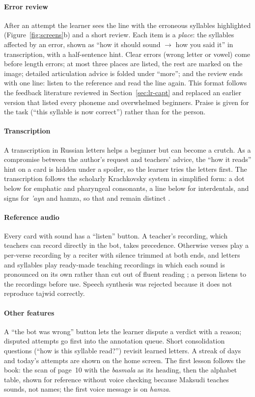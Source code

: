 \paragraph{Error review} After an attempt the learner sees the line with the erroneous syllables
highlighted (Figure~\ref{fig:screens}b) and a short review. Each item is a \emph{place}: the syllables
affected by an error, shown as ``how it should sound $\to$ how you said it'' in transcription, with a
half-sentence hint. Clear errors (wrong letter or vowel) come before length errors; at most three places are
listed, the rest are marked on the image; detailed articulation advice is folded under ``more''; and the
review ends with one line: listen to the reference and read the line again. This format follows the feedback
literature reviewed in Section~\ref{sec:lr-capt} and replaced an earlier version that listed every phoneme
and overwhelmed beginners. Praise is given for the task (``this syllable is now correct'') rather than for
the person.

\paragraph{Transcription} A transcription in Russian letters helps a beginner but can become a crutch. As a
compromise between the author's request and teachers' advice, the ``how it reads'' hint on a card is hidden
under a spoiler, so the learner tries the letters first. The transcription follows the scholarly
Krachkovsky system in simplified form: a dot below for emphatic and pharyngeal consonants, a line below for
interdentals, and signs for \emph{'ayn} and hamza, so that  and  remain distinct \cite{SRC-051}.

\paragraph{Reference audio} Every card with sound has a ``listen'' button. A teacher's recording, which
teachers can record directly in the bot, takes precedence. Otherwise verses play a per-verse
recording by a reciter \cite{SRC-145} with silence trimmed at both ends, and letters and syllables play
ready-made teaching recordings in which each sound is pronounced on its own rather than cut out of fluent
reading \cite{SRC-144}; a person listens to the recordings before use. Speech synthesis was rejected because it does not reproduce tajwid correctly.

\paragraph{Other features} A ``the bot was wrong'' button lets the learner dispute a verdict with a reason;
disputed attempts go first into the annotation queue. Short consolidation questions (``how is this syllable
read?'') revisit learned letters. A streak of days and today's attempts are shown on the home screen. The
first lesson follows the book: the scan of page~10 with the \emph{basmala} as its heading, then the alphabet
table, shown for reference without voice checking because Maksudi teaches sounds, not names; the first voice
message is on \emph{hamza}.


